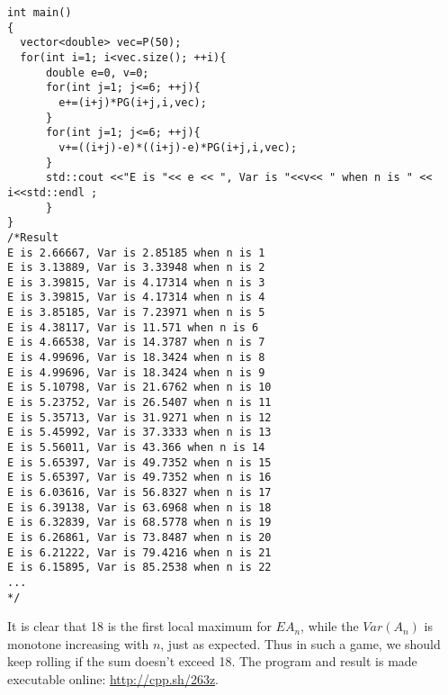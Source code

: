 \documentclass[10pt]{article}
\begin{document}
\begin{enumerate}
\begin{lstlisting}
int main()
{
  vector<double> vec=P(50);
  for(int i=1; i<vec.size(); ++i){
      double e=0, v=0;
      for(int j=1; j<=6; ++j){
        e+=(i+j)*PG(i+j,i,vec);
      }
      for(int j=1; j<=6; ++j){
        v+=((i+j)-e)*((i+j)-e)*PG(i+j,i,vec);
      }
      std::cout <<"E is "<< e << ", Var is "<<v<< " when n is " << i<<std::endl ;
      }
}
/*Result
E is 2.66667, Var is 2.85185 when n is 1
E is 3.13889, Var is 3.33948 when n is 2
E is 3.39815, Var is 4.17314 when n is 3
E is 3.39815, Var is 4.17314 when n is 4
E is 3.85185, Var is 7.23971 when n is 5
E is 4.38117, Var is 11.571 when n is 6
E is 4.66538, Var is 14.3787 when n is 7
E is 4.99696, Var is 18.3424 when n is 8
E is 4.99696, Var is 18.3424 when n is 9
E is 5.10798, Var is 21.6762 when n is 10
E is 5.23752, Var is 26.5407 when n is 11
E is 5.35713, Var is 31.9271 when n is 12
E is 5.45992, Var is 37.3333 when n is 13
E is 5.56011, Var is 43.366 when n is 14
E is 5.65397, Var is 49.7352 when n is 15
E is 5.65397, Var is 49.7352 when n is 16
E is 6.03616, Var is 56.8327 when n is 17
E is 6.39138, Var is 63.6968 when n is 18
E is 6.32839, Var is 68.5778 when n is 19
E is 6.26861, Var is 73.8487 when n is 20
E is 6.21222, Var is 79.4216 when n is 21
E is 6.15895, Var is 85.2538 when n is 22
...
*/
\end{lstlisting}
It is clear that 18 is the first local maximum for $EA_n$, while the $Var(A_n)$ is monotone increasing with $n$, just as expected. Thus in such a game, we should keep rolling if the sum doesn't exceed 18.
The program and result is made executable online: \url{http://cpp.sh/263z}.


\end{enumerate}
\end{document}
